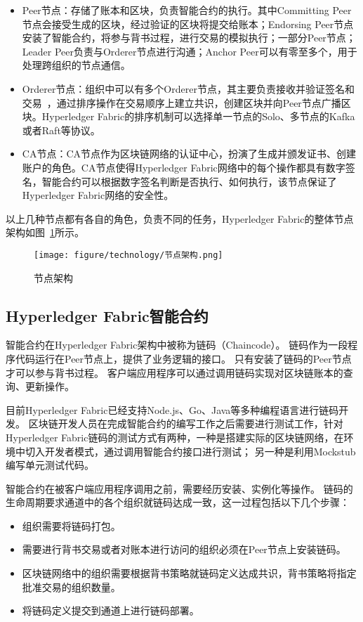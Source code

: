\begin{itemize}
    \item Peer节点：存储了账本和区块，负责智能合约的执行。其中Committing Peer节点会接受生成的区块，经过验证的区块将提交给账本；Endorsing Peer节点安装了智能合约，将参与背书过程，进行交易的模拟执行；一部分Peer节点；Leader Peer负责与Orderer节点进行沟通；Anchor Peer可以有零至多个，用于处理跨组织的节点通信。
    \item Orderer节点：组织中可以有多个Orderer节点，其主要负责接收并验证签名和交易~\cite{DBLP:conf/dsn/SousaBV18}，通过排序操作在交易顺序上建立共识，创建区块并向Peer节点广播区块。Hyperledger Fabric的排序机制可以选择单一节点的Solo、多节点的Kafka或者Raft等协议。
    \item CA节点：CA节点作为区块链网络的认证中心，扮演了生成并颁发证书、创建账户的角色。CA节点使得Hyperledger Fabric网络中的每个操作都具有数字签名，智能合约可以根据数字签名判断是否执行、如何执行，该节点保证了Hyperledger Fabric网络的安全性。
\end{itemize}

以上几种节点都有各自的角色，负责不同的任务，Hyperledger Fabric的整体节点架构如图~\ref{fig:2.3}所示。

\begin{figure}[htb]
  \centering
  \texttt{[image: figure/technology/节点架构.png]}
  \caption{节点架构}\label{fig:2.3}
\end{figure}

\subsection{Hyperledger Fabric智能合约}

智能合约在Hyperledger Fabric架构中被称为链码（Chaincode）。
链码作为一段程序代码运行在Peer节点上，提供了业务逻辑的接口。
只有安装了链码的Peer节点才可以参与背书过程。
客户端应用程序可以通过调用链码实现对区块链账本的查询、更新操作。

目前Hyperledger Fabric已经支持Node.js、Go、Java等多种编程语言进行链码开发。
区块链开发人员在完成智能合约的编写工作之后需要进行测试工作，针对Hyperledger Fabric链码的测试方式有两种，一种是搭建实际的区块链网络，在环境中切入开发者模式，通过调用智能合约接口进行测试；
另一种是利用Mockstub编写单元测试代码。

智能合约在被客户端应用程序调用之前，需要经历安装、实例化等操作。
链码的生命周期要求通道中的各个组织就链码达成一致，这一过程包括以下几个步骤：

\begin{itemize}
    \item 组织需要将链码打包。
    \item 需要进行背书交易或者对账本进行访问的组织必须在Peer节点上安装链码。
    \item 区块链网络中的组织需要根据背书策略就链码定义达成共识，背书策略将指定批准交易的组织数量。
    \item 将链码定义提交到通道上进行链码部署。
\end{itemize}

